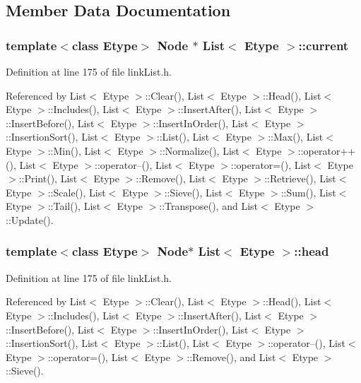 \subsection{Member Data Documentation}
\subsubsection{\setlength{\rightskip}{0pt plus 5cm}template$<$class Etype$>$ {\bf Node} $\ast$ {\bf List}$<$ Etype $>$::{\bf current}\hspace{0.3cm}{\tt  [protected]}}\label{classList_p1}




Definition at line 175 of file link\-List.h.

Referenced by List$<$ Etype $>$::Clear(), List$<$ Etype $>$::Head(), List$<$ Etype $>$::Includes(), List$<$ Etype $>$::Insert\-After(), List$<$ Etype $>$::Insert\-Before(), List$<$ Etype $>$::Insert\-In\-Order(), List$<$ Etype $>$::Insertion\-Sort(), List$<$ Etype $>$::List(), List$<$ Etype $>$::Max(), List$<$ Etype $>$::Min(), List$<$ Etype $>$::Normalize(), List$<$ Etype $>$::operator++(), List$<$ Etype $>$::operator--(), List$<$ Etype $>$::operator=(), List$<$ Etype $>$::Print(), List$<$ Etype $>$::Remove(), List$<$ Etype $>$::Retrieve(), List$<$ Etype $>$::Scale(), List$<$ Etype $>$::Sieve(), List$<$ Etype $>$::Sum(), List$<$ Etype $>$::Tail(), List$<$ Etype $>$::Transpose(), and List$<$ Etype $>$::Update().
\subsubsection{\setlength{\rightskip}{0pt plus 5cm}template$<$class Etype$>$ {\bf Node}$\ast$ {\bf List}$<$ Etype $>$::{\bf head}\hspace{0.3cm}{\tt  [protected]}}\label{classList_p0}




Definition at line 175 of file link\-List.h.

Referenced by List$<$ Etype $>$::Clear(), List$<$ Etype $>$::Head(), List$<$ Etype $>$::Includes(), List$<$ Etype $>$::Insert\-After(), List$<$ Etype $>$::Insert\-Before(), List$<$ Etype $>$::Insert\-In\-Order(), List$<$ Etype $>$::Insertion\-Sort(), List$<$ Etype $>$::List(), List$<$ Etype $>$::operator--(), List$<$ Etype $>$::operator=(), List$<$ Etype $>$::Remove(), and List$<$ Etype $>$::Sieve().
